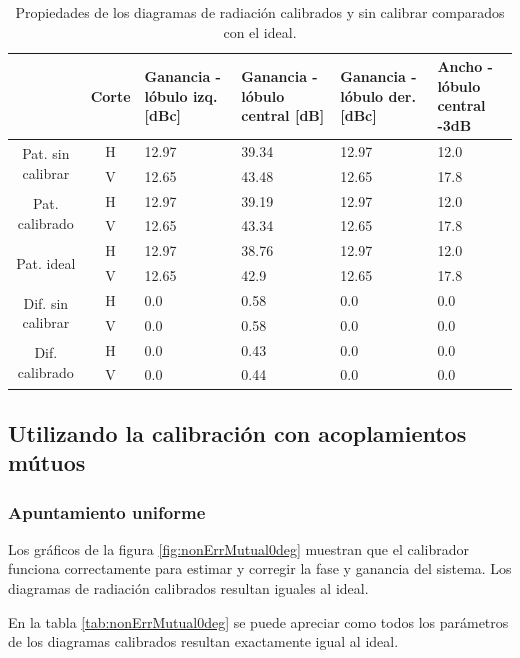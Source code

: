 \begin{table}[H]
  \footnotesize
  \centering
  \begin{tabular}{|c|c|p{2cm}|p{2.5cm}|p{2.5cm}|p{2.5cm}|}
    \cline{2-6}
    \multicolumn{1}{c|}{} & Corte & Ganancia - lóbulo izq. [dBc] & Ganancia - lóbulo central [dB] &
    Ganancia - lóbulo der. [dBc] & Ancho - lóbulo central -3dB \tabularnewline\hline
    \multirow{2}{2cm}{Pat. sin calibrar} & H & 12.97 & 39.34 & 12.97 & 12.0 \tabularnewline\cline{2-6}
     & V & 12.65 & 43.48 & 12.65 & 17.8 \tabularnewline\hline
    \multirow{2}{2cm}{Pat. calibrado} & H & 12.97 & 39.19 & 12.97 & 12.0 \tabularnewline\cline{2-6}
     & V & 12.65 & 43.34 & 12.65 & 17.8 \tabularnewline\hline
    \multirow{2}{2cm}{Pat. ideal} & H & 12.97 & 38.76 & 12.97 & 12.0 \tabularnewline\cline{2-6}
     & V & 12.65 & 42.9 & 12.65 & 17.8 \tabularnewline\hline
    \multirow{2}{2cm}{Dif. sin calibrar} & H & 0.0 & 0.58 & 0.0 & 0.0\tabularnewline\cline{2-6}
     & V & 0.0 & 0.58 & 0.0 & 0.0 \tabularnewline\hline
    \multirow{2}{2cm}{Dif. calibrado} & H & 0.0 & 0.43 & 0.0 & 0.0 \tabularnewline\cline{2-6}
     & V & 0.0 & 0.44 & 0.0 & 0.0 \tabularnewline\hline
  \end{tabular}
  \caption{Propiedades de los diagramas de radiación calibrados y sin calibrar comparados con el ideal.}
  \label{tab:nonErrClassical10degRow}
\end{table}


\subsection{Utilizando la calibración con acoplamientos mútuos}


\subsubsection{Apuntamiento uniforme}

Los gráficos de la figura \ref{fig:nonErrMutual0deg} muestran que el calibrador funciona correctamente para estimar y corregir la 
fase y ganancia del sistema. Los diagramas de radiación calibrados resultan iguales al ideal.

En la tabla \ref{tab:nonErrMutual0deg} se puede apreciar como todos los parámetros de los diagramas calibrados resultan 
exactamente igual al ideal.

